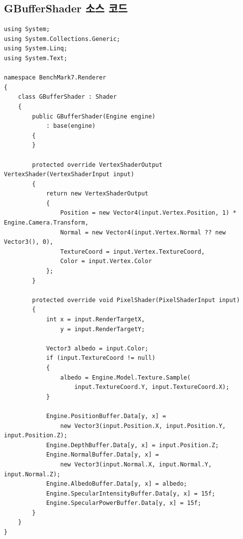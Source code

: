 \documentclass[a4paper,itemph,amsmath,oneside,11pt,openany]{xoblivoir}
\begin{document}
\subsection{GBufferShader 소스 코드}
\begin{verbatim}
using System;
using System.Collections.Generic;
using System.Linq;
using System.Text;

namespace BenchMark7.Renderer
{
    class GBufferShader : Shader
    {
        public GBufferShader(Engine engine)
            : base(engine)
        {
        }

        protected override VertexShaderOutput VertexShader(VertexShaderInput input)
        {                        
            return new VertexShaderOutput
            {
                Position = new Vector4(input.Vertex.Position, 1) * Engine.Camera.Transform,
                Normal = new Vector4(input.Vertex.Normal ?? new Vector3(), 0),
                TextureCoord = input.Vertex.TextureCoord,
                Color = input.Vertex.Color
            };
        }

        protected override void PixelShader(PixelShaderInput input)
        {
            int x = input.RenderTargetX,
                y = input.RenderTargetY;

            Vector3 albedo = input.Color;
            if (input.TextureCoord != null)
            {
                albedo = Engine.Model.Texture.Sample(
                    input.TextureCoord.Y, input.TextureCoord.X);
            }

            Engine.PositionBuffer.Data[y, x] =
                new Vector3(input.Position.X, input.Position.Y, input.Position.Z);
            Engine.DepthBuffer.Data[y, x] = input.Position.Z;
            Engine.NormalBuffer.Data[y, x] =
                new Vector3(input.Normal.X, input.Normal.Y, input.Normal.Z);
            Engine.AlbedoBuffer.Data[y, x] = albedo;
            Engine.SpecularIntensityBuffer.Data[y, x] = 15f;
            Engine.SpecularPowerBuffer.Data[y, x] = 15f;
        }
    }
}
\end{verbatim}
\end{document}
